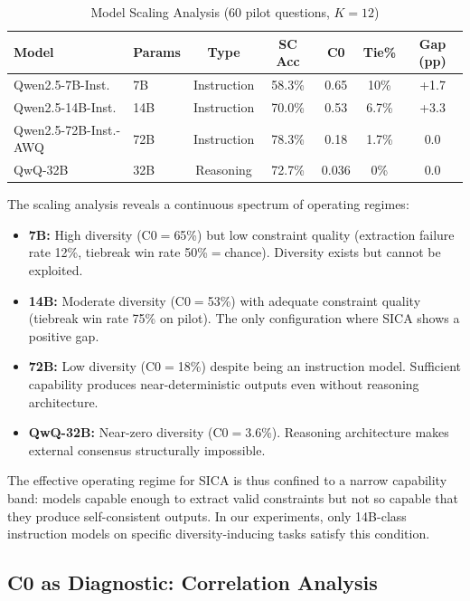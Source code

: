 \documentclass[11pt]{article}
\begin{document}
\begin{table}[h]
\centering
\caption{Model Scaling Analysis (60 pilot questions, $K=12$)}
\label{tab:scaling}
\begin{tabular}{llccccc}
\toprule
Model & Params & Type & SC Acc & C0 & Tie\% & Gap (pp) \\
\midrule
Qwen2.5-7B-Inst. & 7B & Instruction & 58.3\% & 0.65 & 10\% & +1.7 \\
Qwen2.5-14B-Inst. & 14B & Instruction & 70.0\% & 0.53 & 6.7\% & +3.3 \\
Qwen2.5-72B-Inst.-AWQ & 72B & Instruction & 78.3\% & 0.18 & 1.7\% & 0.0 \\
QwQ-32B & 32B & Reasoning & 72.7\% & 0.036 & 0\% & 0.0 \\
\bottomrule
\end{tabular}
\end{table}

The scaling analysis reveals a continuous spectrum of operating regimes:

\begin{itemize}
    \item \textbf{7B:} High diversity (C0$=$65\%) but low constraint quality (extraction failure rate 12\%, tiebreak win rate 50\%$=$chance). Diversity exists but cannot be exploited.
    \item \textbf{14B:} Moderate diversity (C0$=$53\%) with adequate constraint quality (tiebreak win rate 75\% on pilot). The only configuration where SICA shows a positive gap.
    \item \textbf{72B:} Low diversity (C0$=$18\%) despite being an instruction model. Sufficient capability produces near-deterministic outputs even without reasoning architecture.
    \item \textbf{QwQ-32B:} Near-zero diversity (C0$=$3.6\%). Reasoning architecture makes external consensus structurally impossible.
\end{itemize}

The effective operating regime for SICA is thus confined to a narrow capability band: models capable enough to extract valid constraints but not so capable that they produce self-consistent outputs. In our experiments, only 14B-class instruction models on specific diversity-inducing tasks satisfy this condition.

\subsection{C0 as Diagnostic: Correlation Analysis}
\end{document}
